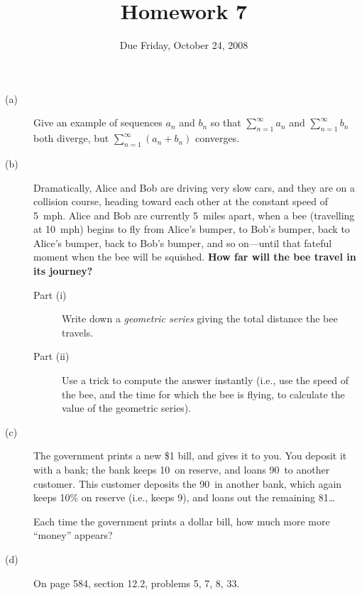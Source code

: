 \documentclass[12pt]{article}
\title{Homework 7}
\date{Due Friday, October 24, 2008}
\begin{document}
\maketitle

\begin{description}

\item[(a)] Give an example of sequences $a_n$ and $b_n$ so that
$\displaystyle\sum_{n=1}^\infty a_n$ and
$\displaystyle\sum_{n=1}^\infty b_n$ both diverge, but
$\displaystyle\sum_{n=1}^\infty \left( a_n + b_n \right)$ converges.

\vfill

\item[(b)] Dramatically, Alice and Bob are driving very slow cars, and they are
on a collision course, heading toward each other at the constant speed
of 5~mph.  Alice and Bob are currently 5~miles apart, when a bee
(travelling at 10~mph) begins to fly from Alice's bumper, to Bob's
bumper, back to Alice's bumper, back to Bob's bumper, and so
on---until that fateful moment when the bee will be squished.
\textbf{How far will the bee travel in its journey?}
\begin{description}
\item[Part (i)] Write down a \textit{geometric series} giving the
total distance the bee travels.
\item[Part (ii)] Use a trick to compute the answer instantly (i.e., use
  the speed of the bee, and the time for which the bee is flying, to
  calculate the value of the geometric series).
\end{description}

\vfill

\item[(c)] The government prints a new \$1 bill, and gives it to you.
  You deposit it with a bank; the bank keeps 10\cent\ on reserve, and
  loans 90\cent\ to another customer.  This customer deposits the
  90\cent\ in another bank, which again keeps 10\% on reserve (i.e.,
  keeps 9\cent), and loans out the remaining 81\cent\ldots

  Each time the government prints a dollar bill, how much more more
  ``money'' appears?

\vfill

\item[(d)] On page 584, section 12.2, problems 5, 7, 8, 33.

\end{description}
\end{document}
